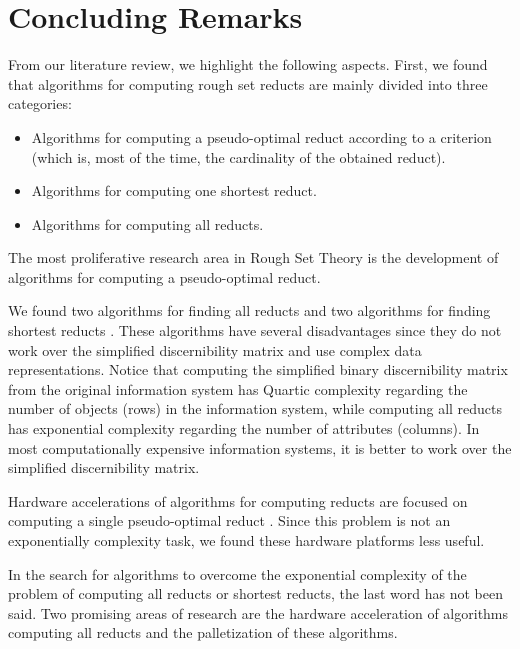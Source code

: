 \documentclass[citenumber]{llncs}
\begin{document}
\section{Concluding Remarks}\label{conclusions}
   From our literature review, we highlight the following aspects. First, we found that algorithms for computing rough set reducts are mainly divided into three categories:
    \begin{itemize}
  	  \item Algorithms for computing a pseudo-optimal reduct according to a criterion (which is, most of the 
  	  		time, the cardinality of the obtained reduct).
  	  \item Algorithms for computing one shortest reduct.
  	  \item Algorithms for computing all reducts.
    \end{itemize}
    The most proliferative research area in Rough Set Theory is the development of algorithms for computing a 
    pseudo-optimal reduct. 
    
    We found two algorithms for finding all reducts \cite{Starzyk00,WangP07} and two algorithms for finding shortest reducts \cite{Lin04,Jensen14}. These algorithms have several disadvantages since they do not work over the simplified discernibility matrix and use complex data representations. Notice that computing the simplified binary discernibility matrix from the original information system has Quartic complexity regarding the number of objects (rows) in the information system, while computing all reducts has exponential complexity regarding the number of attributes (columns). In most computationally expensive information systems, it is better to work over the simplified discernibility matrix. 
    
    Hardware accelerations of algorithms for computing reducts are focused on computing a single pseudo-optimal reduct \cite{Tiwari11,Tiwari12,Tiwari13,Grzes13,Kopczynski14,Tiwari14}. Since this problem is not an exponentially complexity task, we found these hardware platforms less useful.	
		    
    In the search for algorithms to overcome the exponential complexity of the problem of computing all reducts or
    shortest reducts, the last word has not been said. Two promising areas of research are the hardware acceleration of algorithms computing all reducts and the palletization of these algorithms.
  
%


\end{document}
